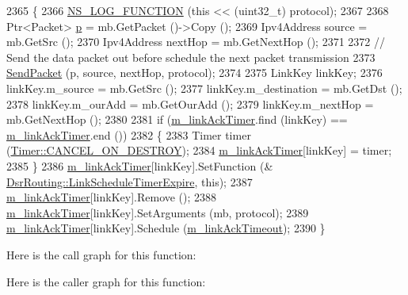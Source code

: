 \begin{DoxyCode}
2365 \{
2366   \hyperlink{log-macros-disabled_8h_a90b90d5bad1f39cb1b64923ea94c0761}{NS\_LOG\_FUNCTION} (\textcolor{keyword}{this} << (uint32\_t) protocol);
2367 
2368   Ptr<Packet> \hyperlink{lte__link__budget_8m_ac9de518908a968428863f829398a4e62}{p} = mb.GetPacket ()->Copy ();
2369   Ipv4Address source = mb.GetSrc ();
2370   Ipv4Address nextHop = mb.GetNextHop ();
2371 
2372   \textcolor{comment}{// Send the data packet out before schedule the next packet transmission}
2373   \hyperlink{classns3_1_1dsr_1_1DsrRouting_a84a2caf24a41eef8993b64cb22874f95}{SendPacket} (p, source, nextHop, protocol);
2374 
2375   LinkKey linkKey;
2376   linkKey.m\_source = mb.GetSrc ();
2377   linkKey.m\_destination = mb.GetDst ();
2378   linkKey.m\_ourAdd = mb.GetOurAdd ();
2379   linkKey.m\_nextHop = mb.GetNextHop ();
2380 
2381   \textcolor{keywordflow}{if} (\hyperlink{classns3_1_1dsr_1_1DsrRouting_ad532172035dbd4b038de0e94f4ce5ff6}{m\_linkAckTimer}.find (linkKey) == \hyperlink{classns3_1_1dsr_1_1DsrRouting_ad532172035dbd4b038de0e94f4ce5ff6}{m\_linkAckTimer}.end ())
2382     \{
2383       Timer timer (\hyperlink{classns3_1_1Timer_a816309b83cd2a35bea47d9bbc6bbf721a07a9dd5063b32fb6cf1f813c6ee7e28e}{Timer::CANCEL\_ON\_DESTROY});
2384       \hyperlink{classns3_1_1dsr_1_1DsrRouting_ad532172035dbd4b038de0e94f4ce5ff6}{m\_linkAckTimer}[linkKey] = timer;
2385     \}
2386   \hyperlink{classns3_1_1dsr_1_1DsrRouting_ad532172035dbd4b038de0e94f4ce5ff6}{m\_linkAckTimer}[linkKey].SetFunction (&
      \hyperlink{classns3_1_1dsr_1_1DsrRouting_ab0ce215bf5359f4d6d4541b8a479007c}{DsrRouting::LinkScheduleTimerExpire}, \textcolor{keyword}{this});
2387   \hyperlink{classns3_1_1dsr_1_1DsrRouting_ad532172035dbd4b038de0e94f4ce5ff6}{m\_linkAckTimer}[linkKey].Remove ();
2388   \hyperlink{classns3_1_1dsr_1_1DsrRouting_ad532172035dbd4b038de0e94f4ce5ff6}{m\_linkAckTimer}[linkKey].SetArguments (mb, protocol);
2389   \hyperlink{classns3_1_1dsr_1_1DsrRouting_ad532172035dbd4b038de0e94f4ce5ff6}{m\_linkAckTimer}[linkKey].Schedule (\hyperlink{classns3_1_1dsr_1_1DsrRouting_ace1671263c7f09cd2523f1c81dc41631}{m\_linkAckTimeout});
2390 \}
\end{DoxyCode}


Here is the call graph for this function\+:




Here is the caller graph for this function\+:



